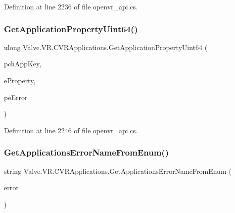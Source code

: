 Definition at line 2236 of file openvr\+\_\+api.\+cs.

\mbox{\label{class_valve_1_1_v_r_1_1_c_v_r_applications_aaf2b2e7b063089791120ecc1be6653f9}} 
\subsubsection{\texorpdfstring{GetApplicationPropertyUint64()}{GetApplicationPropertyUint64()}}
{\footnotesize\ttfamily ulong Valve.\+V\+R.\+C\+V\+R\+Applications.\+Get\+Application\+Property\+Uint64 (\begin{DoxyParamCaption}\item[{string}]{pch\+App\+Key,  }\item[{\mbox{\hyperlink{namespace_valve_1_1_v_r_a60802f09ad1b4764cd5bc78369d50bf3}{E\+V\+R\+Application\+Property}}}]{e\+Property,  }\item[{ref \mbox{\hyperlink{namespace_valve_1_1_v_r_a3488adab8a219b579fcee50f4e63a8b6}{E\+V\+R\+Application\+Error}}}]{pe\+Error }\end{DoxyParamCaption})}



Definition at line 2246 of file openvr\+\_\+api.\+cs.

\mbox{\label{class_valve_1_1_v_r_1_1_c_v_r_applications_ac5275c11f9ff77cc7a68f11e1ba1ba5c}} 
\subsubsection{\texorpdfstring{GetApplicationsErrorNameFromEnum()}{GetApplicationsErrorNameFromEnum()}}
{\footnotesize\ttfamily string Valve.\+V\+R.\+C\+V\+R\+Applications.\+Get\+Applications\+Error\+Name\+From\+Enum (\begin{DoxyParamCaption}\item[{\mbox{\hyperlink{namespace_valve_1_1_v_r_a3488adab8a219b579fcee50f4e63a8b6}{E\+V\+R\+Application\+Error}}}]{error }\end{DoxyParamCaption})}




